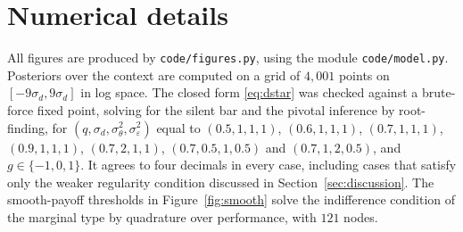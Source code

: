 \documentclass[11pt]{article}
\theoremstyle{definition}
\newcommand{\sd}{\sigma_d}
\newcommand{\sth}{\sigma_\theta}
\newcommand{\se}{\sigma_\varepsilon}
\begin{document}
\section{Numerical details}\label{app:numerics}

All figures are produced by \texttt{code/figures.py}, using the module \texttt{code/model.py}. Posteriors over the context are computed on a grid of $4{,}001$ points on $[-9\sd,9\sd]$ in log space. The closed form \eqref{eq:dstar} was checked against a brute-force fixed point, solving for the silent bar and the pivotal inference by root-finding, for $(q,\sd,\sth^2,\se^2)$ equal to $(0.5,1,1,1)$, $(0.6,1,1,1)$, $(0.7,1,1,1)$, $(0.9,1,1,1)$, $(0.7,2,1,1)$, $(0.7,0.5,1,0.5)$ and $(0.7,1,2,0.5)$, and $g\in\{-1,0,1\}$. It agrees to four decimals in every case, including cases that satisfy only the weaker regularity condition discussed in Section~\ref{sec:discussion}. The smooth-payoff thresholds in Figure~\ref{fig:smooth} solve the indifference condition of the marginal type by quadrature over performance, with $121$ nodes.
\end{document}
